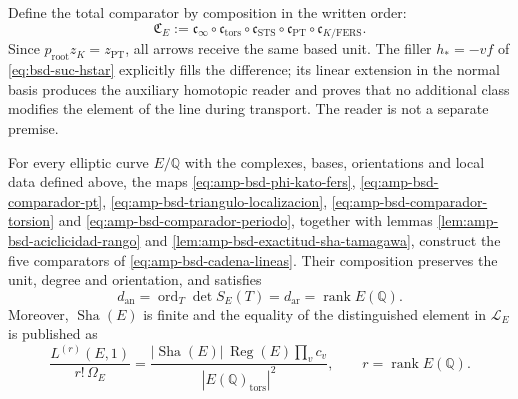 Define the total comparator by composition in the written order:
\begin{equation}\label{eq:amp-bsd-comparador-total}
 \mathfrak C_E:=
 \mathfrak c_\infty\circ
 \mathfrak c_{\mathrm{tors}}\circ
 \mathfrak c_{\mathrm{STS}}\circ
 \mathfrak c_{\mathrm{PT}}\circ
 \mathfrak c_{K/\mathrm{FERS}}.
\end{equation}
Since \(p_{\mathrm{root}}z_K=z_{\mathrm{PT}}\), all arrows receive the
same based unit. The filler \(h_*=-vf\) of
\eqref{eq:bsd-suc-hstar} explicitly fills the difference; its linear
extension in the normal basis produces the auxiliary homotopic reader and proves that
no additional class modifies the element of the line during
transport. The reader is not a separate premise.

\begin{theorem}
\label{thm:amp-bsd-comparadores-construidos}
For every elliptic curve \(E/\mathbb Q\) with the complexes, bases,
orientations and local data defined above, the maps
\eqref{eq:amp-bsd-phi-kato-fers},
\eqref{eq:amp-bsd-comparador-pt},
\eqref{eq:amp-bsd-triangulo-localizacion},
\eqref{eq:amp-bsd-comparador-torsion} and
\eqref{eq:amp-bsd-comparador-periodo}, together with lemmas
\ref{lem:amp-bsd-aciclicidad-rango} and
\ref{lem:amp-bsd-exactitud-sha-tamagawa}, construct the five comparators of
\eqref{eq:amp-bsd-cadena-lineas}. Their composition preserves the unit, degree
and orientation, and satisfies
\begin{equation}\label{eq:amp-bsd-igualdad-grados}
 d_{\mathrm{an}}=\operatorname{ord}_T\det S_E(T)
 =d_{\mathrm{ar}}=\operatorname{rank}E(\mathbb Q).
\end{equation}
Moreover, \(\operatorname{Sha}(E)\) is finite and the equality of the distinguished
element in \(\mathcal L_E\) is published as
\begin{equation}\label{eq:amp-bsd-termino-principal}
 \frac{L^{(r)}(E,1)}{r!\,\Omega_E}
 =\frac{|\operatorname{Sha}(E)|\,\operatorname{Reg}(E)
        \prod_v c_v}
       {|E(\mathbb Q)_{\mathrm{tors}}|^2},
 \qquad r=\operatorname{rank}E(\mathbb Q).
\end{equation}
\end{theorem}

